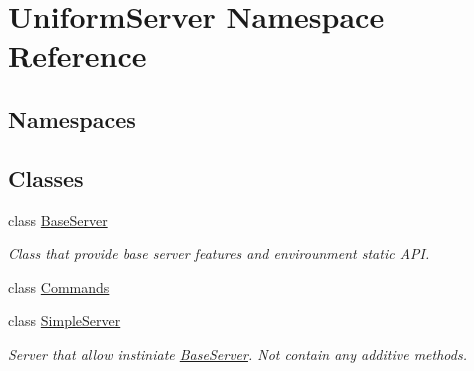 \hypertarget{namespace_uniform_server}{}\section{Uniform\+Server Namespace Reference}
\label{namespace_uniform_server}
\subsection*{Namespaces}
\begin{DoxyCompactItemize}
\end{DoxyCompactItemize}
\subsection*{Classes}
\begin{DoxyCompactItemize}
\item 
class \mbox{\hyperlink{class_uniform_server_1_1_base_server}{Base\+Server}}
\begin{DoxyCompactList}\small\item\em Class that provide base server features and envirounment static A\+PI. \end{DoxyCompactList}\item 
class \mbox{\hyperlink{class_uniform_server_1_1_commands}{Commands}}
\item 
class \mbox{\hyperlink{class_uniform_server_1_1_simple_server}{Simple\+Server}}
\begin{DoxyCompactList}\small\item\em Server that allow instiniate \mbox{\hyperlink{class_uniform_server_1_1_base_server}{Base\+Server}}. Not contain any additive methods. \end{DoxyCompactList}\end{DoxyCompactItemize}
